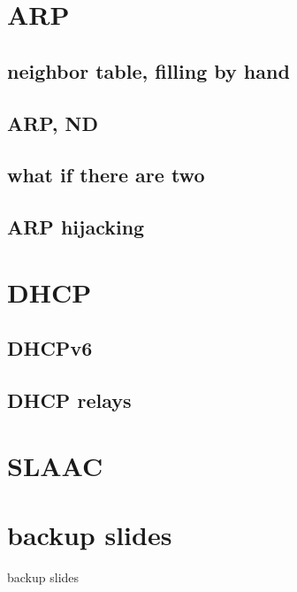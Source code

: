 \section{ARP}

\subsection{neighbor table, filling by hand}


\subsection{ARP, ND}



\subsection{what if there are two}



\subsection{ARP hijacking}




\section{DHCP}

\subsection{DHCPv6}


\subsection{DHCP relays}


\section{SLAAC}



\section{backup slides}
\begin{frame}{backup slides}
\end{frame}


